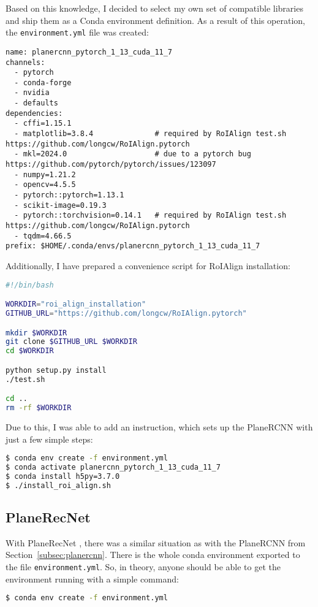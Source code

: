 \par

Based on this knowledge, I decided to select my own set of compatible libraries
and ship them as a Conda \cite{conda-documentation} environment definition.
As a result of this operation, the \texttt{environment.yml} file was created:
\begin{lstlisting}[style=yaml]
name: planercnn_pytorch_1_13_cuda_11_7
channels:
  - pytorch
  - conda-forge
  - nvidia
  - defaults
dependencies:
  - cffi=1.15.1
  - matplotlib=3.8.4              # required by RoIAlign test.sh https://github.com/longcw/RoIAlign.pytorch
  - mkl=2024.0                    # due to a pytorch bug https://github.com/pytorch/pytorch/issues/123097
  - numpy=1.21.2
  - opencv=4.5.5
  - pytorch::pytorch=1.13.1
  - scikit-image=0.19.3
  - pytorch::torchvision=0.14.1   # required by RoIAlign test.sh https://github.com/longcw/RoIAlign.pytorch
  - tqdm=4.66.5
prefix: $HOME/.conda/envs/planercnn_pytorch_1_13_cuda_11_7
\end{lstlisting}

Additionally, I have prepared a convenience script for RoIAlign installation:
\begin{lstlisting}[language=bash]
#!/bin/bash

WORKDIR="roi_align_installation"
GITHUB_URL="https://github.com/longcw/RoIAlign.pytorch"

mkdir $WORKDIR
git clone $GITHUB_URL $WORKDIR
cd $WORKDIR

python setup.py install
./test.sh

cd ..
rm -rf $WORKDIR
\end{lstlisting}

Due to this, I was able to add an instruction, which sets up the PlaneRCNN with just a few simple steps:
\begin{lstlisting}[language=bash]
$ conda env create -f environment.yml
$ conda activate planercnn_pytorch_1_13_cuda_11_7
$ conda install h5py=3.7.0
$ ./install_roi_align.sh
\end{lstlisting}

\subsection{PlaneRecNet}

With PlaneRecNet \cite{xie2021planerecnet},
there was a similar situation as with the PlaneRCNN from Section~\ref{subsec:planercnn}.
There is the whole conda environment exported to the file \texttt{environment.yml}.
So, in theory, anyone should be able to get the environment running with a simple command:
\begin{lstlisting}[language=bash]
$ conda env create -f environment.yml
\end{lstlisting}

